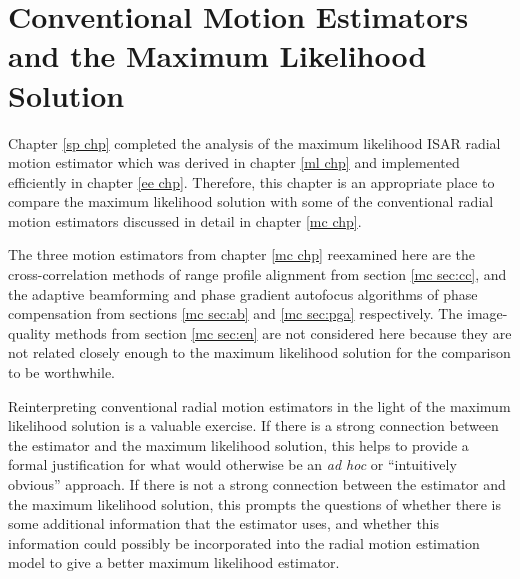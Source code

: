 %
%
%
%
%
%
%


\chapter[Conventional and ML Motion Estimators]{Conventional 
Motion Estimators and the Maximum Likelihood Solution}
\label{do chp}

\bigletter Chapter \ref{sp chp} completed the analysis of the maximum
likelihood ISAR radial motion estimator which was derived in chapter
\ref{ml chp} and implemented efficiently in chapter \ref{ee chp}. 
Therefore, this chapter is an appropriate place to compare the maximum
likelihood solution with some of the conventional radial motion estimators
discussed in detail in chapter \ref{mc chp}.

The three motion estimators from chapter \ref{mc chp} reexamined here are
the cross-correlation methods of range profile alignment from section \ref{mc
sec:cc}, and the adaptive beamforming and phase gradient autofocus
algorithms of phase compensation from sections \ref{mc sec:ab} and \ref{mc
sec:pga} respectively.  The image-quality methods from section \ref{mc
sec:en} are not considered here because they are not related closely enough to
the maximum likelihood solution for the comparison to be worthwhile.

Reinterpreting conventional radial motion estimators in the light of the
maximum likelihood solution is a valuable exercise.  If there is a strong
connection between the estimator and the maximum likelihood solution, this
helps to provide a formal justification for what would otherwise be an {\em
ad hoc\/} or ``intuitively obvious'' approach.  If there is not a strong
connection between the estimator and the maximum likelihood solution, this
prompts the questions of whether there is some additional information that
the estimator uses, and whether this information could possibly be 
incorporated into the radial motion estimation model to give a better 
maximum likelihood estimator.

